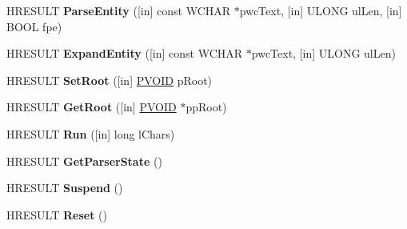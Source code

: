 \begin{DoxyCompactItemize}
\item 
\mbox{\label{interface_x_m_l_p_s_r_1_1_i_x_m_l_parser_aceb1aa32beb8298a5f9953a897b7b15e}} 
H\+R\+E\+S\+U\+LT {\bfseries Parse\+Entity} (\mbox{[}in\mbox{]} const W\+C\+H\+AR $\ast$pwc\+Text, \mbox{[}in\mbox{]} U\+L\+O\+NG ul\+Len, \mbox{[}in\mbox{]} B\+O\+OL fpe)
\item 
\mbox{\label{interface_x_m_l_p_s_r_1_1_i_x_m_l_parser_ad7f9976edcefb3400f6913cdbcf5fd94}} 
H\+R\+E\+S\+U\+LT {\bfseries Expand\+Entity} (\mbox{[}in\mbox{]} const W\+C\+H\+AR $\ast$pwc\+Text, \mbox{[}in\mbox{]} U\+L\+O\+NG ul\+Len)
\item 
\mbox{\label{interface_x_m_l_p_s_r_1_1_i_x_m_l_parser_ae1803388e85cb074cdeb4f9e020f656a}} 
H\+R\+E\+S\+U\+LT {\bfseries Set\+Root} (\mbox{[}in\mbox{]} \hyperlink{interfacevoid}{P\+V\+O\+ID} p\+Root)
\item 
\mbox{\label{interface_x_m_l_p_s_r_1_1_i_x_m_l_parser_a1c6486f1bbafd609422fdfdc240f79d9}} 
H\+R\+E\+S\+U\+LT {\bfseries Get\+Root} (\mbox{[}in\mbox{]} \hyperlink{interfacevoid}{P\+V\+O\+ID} $\ast$pp\+Root)
\item 
\mbox{\label{interface_x_m_l_p_s_r_1_1_i_x_m_l_parser_a273de78e7e942a7263639f0066ac152f}} 
H\+R\+E\+S\+U\+LT {\bfseries Run} (\mbox{[}in\mbox{]} long l\+Chars)
\item 
\mbox{\label{interface_x_m_l_p_s_r_1_1_i_x_m_l_parser_afef65fbfeeb72aeb3f1929dea875f989}} 
H\+R\+E\+S\+U\+LT {\bfseries Get\+Parser\+State} ()
\item 
\mbox{\label{interface_x_m_l_p_s_r_1_1_i_x_m_l_parser_a54ab0e1cd88dd441998a519f698fefb4}} 
H\+R\+E\+S\+U\+LT {\bfseries Suspend} ()
\item 
\mbox{\label{interface_x_m_l_p_s_r_1_1_i_x_m_l_parser_a05fa0ca1b998369441fd53e4939c40b0}} 
H\+R\+E\+S\+U\+LT {\bfseries Reset} ()
\item 
\mbox{\label{interface_x_m_l_p_s_r_1_1_i_x_m_l_parser_a81b5cfc5e244de086f3532eeb6a04619}} 

\end{DoxyCompactItemize}
